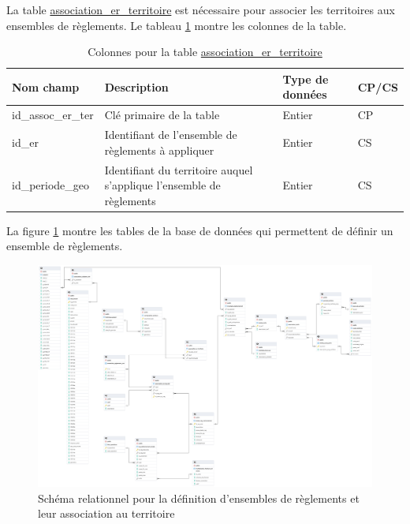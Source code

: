     La table \underline{association\_er\_territoire} est nécessaire pour associer les territoires aux ensembles de règlements. Le tableau \ref{tab:definition_association_er_territoire} montre les colonnes de la table.
    \begin{table}[h]
       \centering
       \begin{tabular}{m{}|m{}m{}m{}}
            \hline
            Nom champ & Description & Type de données & CP/CS  \\
            \hline
            id\_assoc\_er\_ter & Clé primaire de la table & Entier & CP \\  
            id\_er & Identifiant de l'ensemble de règlements à appliquer & Entier & CS \\
            id\_periode\_geo & Identifiant du territoire auquel s'applique l'ensemble de règlements & Entier & CS\\
            \hline
       \end{tabular}
       \caption{Colonnes pour la table \underline{association\_er\_territoire}}
       \label{tab:definition_association_er_territoire}
    \end{table}   
    La figure \ref{fig:offstreet_db_erd_rulesets} montre les tables de la base de données qui permettent de définir un ensemble de règlements.
    \begin{figure}[h]
        \centering
        \includegraphics[trim={16cm 21.5cm 47cm 21.5cm},clip,width=15cm]{images/structure_base_de_donnee.png}
        \caption{Schéma relationnel pour la définition d'ensembles de règlements et leur association au territoire}
        \label{fig:offstreet_db_erd_rulesets}
    \end{figure}
    \FloatBarrier
